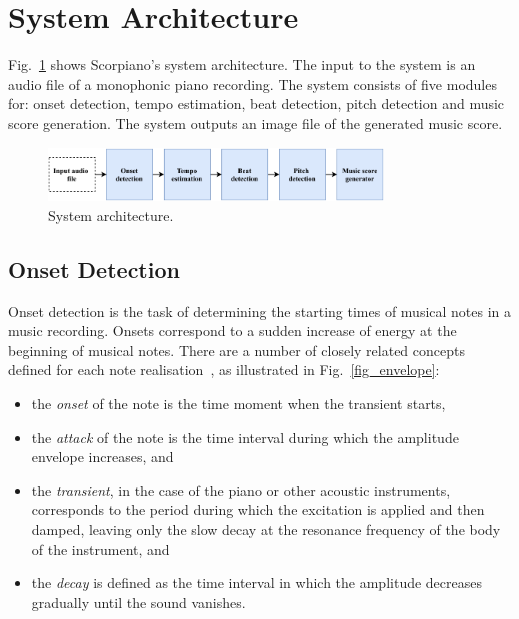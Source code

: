 \documentclass[conference]{IEEEtran}
\begin{document}
\section{System Architecture}

Fig.~\ref{fig_dgm} shows Scorpiano's system architecture. 
The input to the system is an audio file of a monophonic piano recording.
The system consists of five modules for: onset detection, tempo estimation, beat detection, pitch detection and music score generation.
The system outputs an image file of the generated music score.

\begin{figure}[t]
\centering
\vspace{-10pt}
\includegraphics[clip, width=3.5in]{system_block_dgm}
\caption{System architecture.}
\label{fig_dgm}
\vspace{-2pt}
\end{figure}

\subsection{Onset Detection}

Onset detection is the task of determining the starting times of musical notes in a music recording.
Onsets correspond to a sudden increase of energy at the beginning of musical notes.
There are a number of closely related concepts defined for each note realisation~\cite{ONSET:1}, as illustrated in Fig.~\ref{fig_envelope}:
\begin{itemize}
    \item the \emph{onset} of the note is the time moment when the transient starts,
\item the \emph{attack} of the note is the time interval during which the amplitude envelope increases, and
\item the \emph{transient}, in the case of the piano or other acoustic instruments, corresponds to the period during which the excitation is applied and then damped, leaving only the slow decay at the resonance frequency of the body of the instrument, and
\item the \emph{decay} is defined as the time interval in which the amplitude decreases gradually until the sound vanishes.
\end{itemize}
\end{document}
